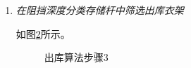 \begin{enumerate}[leftmargin=32pt,label=\bf{步骤\Roman*.}]
{\begin{verbatim}
//     blockDegreeRods[3] -> [A-5,A-6,A-7]    -- A-5、A-6、A-7的第4个衣架是第一个匹配props的衣架
	\end{verbatim}
	}
	\begin{figure}[!h]
		\centering
		\resizebox{0.95\linewidth}{!}{}
		\caption{出库算法步骤2}\label{fig:outbound2}
	\end{figure}
	\clearpage
	\item \it{在阻挡深度分类存储杆中筛选出库衣架}\par
	如图\ref{fig:outbound3}所示。
	\begin{figure}[!h]
		\centering
		\resizebox{0.6\linewidth}{!}{}
		\caption{出库算法步骤3}\label{fig:outbound3}
	\end{figure}

\end{enumerate}

\clearpage
